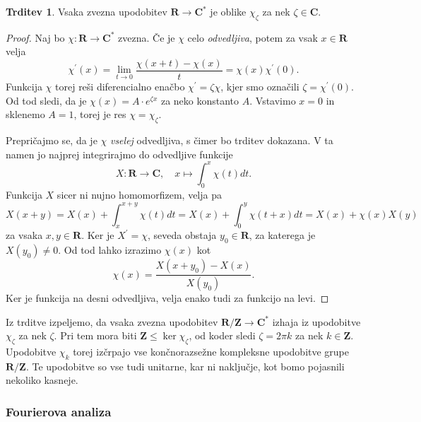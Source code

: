 \documentclass[11pt]{book}
\def\ZZ{\mathbf{Z}}
\def\RR{\mathbf{R}}
\def\CC{\mathbf{C}}
\theoremstyle{definition}
\theoremstyle{zgled}
\theoremstyle{odprtproblem}
\theoremstyle{domacanaloga}
\newenvironment{dokaz}
    {\color{siva}\begin{proof}}
    {\end{proof}}
\theoremstyle{izrek}
\newtheorem*{trditev}{Trditev}
\begin{document}
\begin{trditev}
Vsaka zvezna upodobitev $\RR \to \CC^*$ je oblike $\chi_{\zeta}$ za nek $\zeta \in \CC$.
\end{trditev}
\begin{dokaz}
Naj bo $\chi \colon \RR \to \CC^*$ zvezna. Če je $\chi$ celo \emph{odvedljiva}, potem za vsak $x \in \RR$ velja
\[
    \chi^\prime(x) 
    = \lim_{t \to 0} \frac{\chi(x + t) - \chi(x)}{t}
    = \chi(x) \chi^\prime(0).
\]
Funkcija $\chi$ torej reši diferencialno enačbo $\chi^\prime = \zeta \chi$, kjer smo označili $\zeta = \chi^\prime(0)$. Od tod sledi, da je $\chi(x) = A \cdot e^{\zeta x}$ za neko konstanto $A$. Vstavimo $x = 0$ in sklenemo $A = 1$, torej je res $\chi = \chi_{\zeta}$.

Prepričajmo se, da je $\chi$ \emph{vselej} odvedljiva, s čimer bo trditev dokazana. V ta namen jo najprej integrirajmo do odvedljive funkcije
\[
    X \colon \RR \to \CC, \quad 
    x \mapsto \int_{0}^{x} \chi(t) dt.
\]
Funkcija $X$ sicer ni nujno homomorfizem, velja pa
\[
    X(x + y)
    = X(x) + \int_{x}^{x+y} \chi(t) dt
    = X(x) + \int_{0}^{y} \chi(t+x) dt
    = X(x) + \chi(x) X(y)
\]
za vsaka $x,y \in \RR$. Ker je $X^\prime = \chi$, seveda obstaja $y_0 \in \RR$, za katerega je $X(y_0) \neq 0$. Od tod lahko izrazimo $\chi(x)$ kot
\[
    \chi(x) = \frac{X(x+y_0) - X(x)}{X(y_0)}.
\] 
Ker je funkcija na desni odvedljiva, velja enako tudi za funkcijo na levi.
\end{dokaz}

Iz trditve izpeljemo, da vsaka zvezna upodobitev $\RR/\ZZ \to \CC^*$ izhaja iz upodobitve $\chi_{\zeta}$ za nek $\zeta$. Pri tem mora biti $\ZZ \leq \ker \chi_{\zeta}$, od koder sledi $\zeta = 2 \pi k$ za nek $k \in \ZZ$. Upodobitve $\chi_k$ torej izčrpajo vse končnorazsežne kompleksne upodobitve grupe $\RR/\ZZ$. Te upodobitve so vse tudi unitarne, kar ni naključje, kot bomo pojasnili nekoliko kasneje.

\subsubsection{Fourierova analiza}
\end{document}
